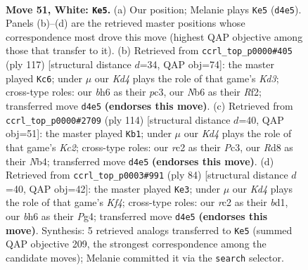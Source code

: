 \documentclass[11pt]{article}
\begin{document}
\clearpage

\begin{figure}[p]\centering
\begin{subfigure}{0.46\textwidth}\centering
\resizebox{\linewidth}{!}{%
\newchessgame
\chessboard[
  setfen={3R4/1p5k/1N4pb/5p1p/P2K4/6PP/2rr4/8 w - - 4 51},
  showmover=false,
  pgfstyle=straightmove, color=movearrow, markmove={d4-e5}
]}
\caption{}
\end{subfigure}\hfill
\begin{subfigure}{0.46\textwidth}\centering
\resizebox{\linewidth}{!}{%
\newchessgame
\chessboard[
  setfen={3RR3/8/pp1k2r1/8/P5p1/1KP5/1P3r2/8 b - - 5 59},
  showmover=false,
  pgfstyle=straightmove, color=movearrow, markmove={d6-c6}
]}
\caption{}
\end{subfigure}
\\[4pt]
\begin{subfigure}{0.46\textwidth}\centering
\resizebox{\linewidth}{!}{%
\newchessgame
\chessboard[
  setfen={8/bPB2k2/5p2/3p2p1/1N4P1/2P5/2K2r2/8 w - - 7 58},
  showmover=false,
  pgfstyle=straightmove, color=movearrow, markmove={c2-b1}
]}
\caption{}
\end{subfigure}\hfill
\begin{subfigure}{0.46\textwidth}\centering
\resizebox{\linewidth}{!}{%
\newchessgame
\chessboard[
  setfen={5rk1/p5p1/3p3p/P2P3P/1R3KPB/8/8/3b4 w - - 5 43},
  showmover=false,
  pgfstyle=straightmove, color=movearrow, markmove={f4-e3}
]}
\caption{}
\end{subfigure}
\caption{\textbf{Move 51, White: \texttt{Ke5}.} (a) Our position; Melanie plays \texttt{Ke5} (\texttt{d4e5}). Panels (b)--(d) are the retrieved master positions whose correspondence most drove this move (highest QAP objective among those that transfer to it). (b) Retrieved from \texttt{ccrl\_top\_p0000\#405} (ply 117) [structural distance $d$=34, QAP obj=74]: the master played \texttt{Kc6}; under $\mu$ our \emph{Kd4} plays the role of that game's \emph{Kd3}; cross-type roles: our \emph{b}h6 as their \emph{p}c3, our \emph{N}b6 as their \emph{R}f2; transferred move \texttt{d4e5} \textbf{(endorses this move)}. (c) Retrieved from \texttt{ccrl\_top\_p0000\#2709} (ply 114) [structural distance $d$=40, QAP obj=51]: the master played \texttt{Kb1}; under $\mu$ our \emph{Kd4} plays the role of that game's \emph{Kc2}; cross-type roles: our \emph{r}c2 as their \emph{P}c3, our \emph{R}d8 as their \emph{N}b4; transferred move \texttt{d4e5} \textbf{(endorses this move)}. (d) Retrieved from \texttt{ccrl\_top\_p0003\#991} (ply 84) [structural distance $d$=40, QAP obj=42]: the master played \texttt{Ke3}; under $\mu$ our \emph{Kd4} plays the role of that game's \emph{Kf4}; cross-type roles: our \emph{r}c2 as their \emph{b}d1, our \emph{b}h6 as their \emph{P}g4; transferred move \texttt{d4e5} \textbf{(endorses this move)}. Synthesis: 5 retrieved analogs transferred to \texttt{Ke5} (summed QAP objective 209, the strongest correspondence among the candidate moves); Melanie committed it via the \texttt{search} selector.}
\label{fig:thought-m100}
\end{figure}
\end{document}

